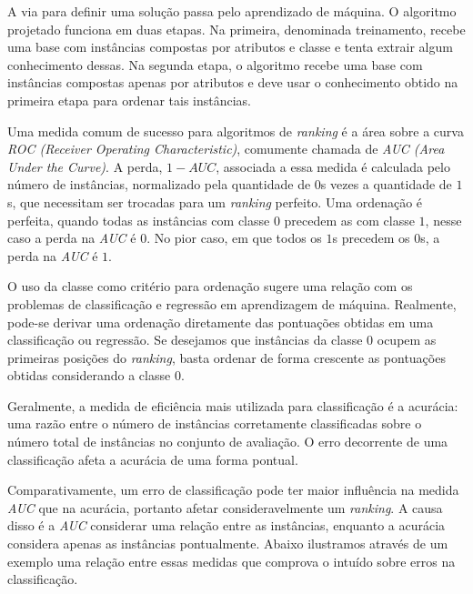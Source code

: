 A via para definir uma solução passa pelo aprendizado de máquina. O algoritmo
projetado funciona em duas etapas. Na primeira, denominada treinamento, recebe
uma base com instâncias compostas por atributos e classe e tenta extrair algum
conhecimento dessas. Na segunda etapa, o algoritmo recebe uma base com
instâncias compostas apenas por atributos e deve usar o conhecimento obtido na
primeira etapa para ordenar tais instâncias.

Uma medida comum de sucesso para algoritmos de \emph{ranking} é a área sobre a
curva \emph{ROC (Receiver Operating Characteristic)}, comumente chamada de
\emph{AUC (Area Under the Curve)}. A perda, $1 - AUC$, associada a essa medida
é calculada pelo número de instâncias, normalizado pela quantidade de $0$s
vezes a quantidade de $1$s, que necessitam ser trocadas para um \emph{ranking}
perfeito. Uma ordenação é perfeita, quando todas as instâncias com classe $0$
precedem as com classe $1$, nesse caso a perda na \emph{AUC} é $0$. No pior
caso, em que todos os $1$s precedem os $0$s, a perda na \emph{AUC} é $1$.

O uso da classe como critério para ordenação sugere uma relação com os problemas
de classificação e regressão em aprendizagem de máquina. Realmente, pode-se
derivar uma ordenação diretamente das pontuações obtidas em uma classificação ou
regressão. Se desejamos que instâncias da classe $0$ ocupem as primeiras
posições do \emph{ranking}, basta ordenar de forma crescente as pontuações
obtidas considerando a classe $0$.

Geralmente, a medida de eficiência mais utilizada para classificação é a
acurácia: uma razão entre o número de instâncias corretamente classificadas
sobre o número total de instâncias no conjunto de avaliação. O erro decorrente
de uma classificação afeta a acurácia de uma forma pontual.

Comparativamente, um erro de classificação pode ter maior influência na medida
\emph{AUC} que na acurácia, portanto afetar consideravelmente um \emph{ranking}.
A causa disso é a \emph{AUC} considerar uma relação entre as instâncias,
enquanto a acurácia considera apenas as instâncias pontualmente. Abaixo
ilustramos através de um exemplo uma relação entre essas medidas que comprova o
intuído sobre erros na classificação.

